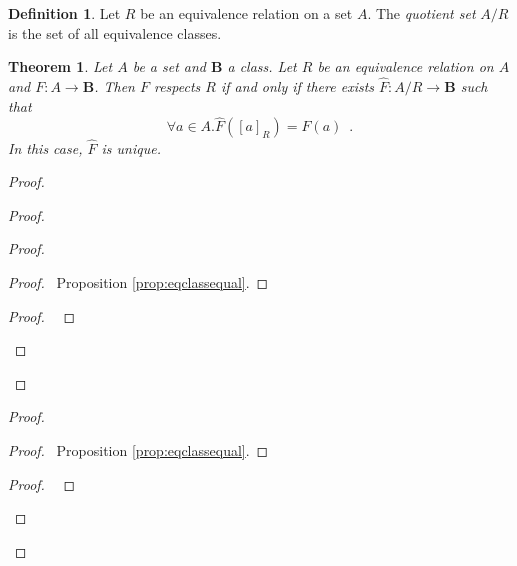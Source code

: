 \documentclass{book}
\let\qed\relax
\newtheorem{thm}[ax]{Theorem}
\theoremstyle{definition}
\newtheorem{df}[ax]{Definition}
\newcommand{\dom}{\ensuremath{\operatorname{dom}}}
\newcommand{\ran}{\ensuremath{\operatorname{ran}}}
\begin{document}
\begin{df}
Let $R$ be an equivalence relation on a set $A$. The \emph{quotient set} $A / R$ is the set of all equivalence classes.
\end{df}

\begin{thm}
Let $A$ be a set and $\mathbf{B}$ a class. Let $R$ be an equivalence relation on $A$ and $F : A \rightarrow \mathbf{B}$. Then $F$ respects $R$ if and only if there exists $\hat{F} : A/R \rightarrow \mathbf{B}$ such that
\[ \forall a \in A. \hat{F}([a]_R) = F(a) \enspace . \]
In this case, $\hat{F}$ is unique.
\end{thm}

\begin{proof}
\pf
{}
\begin{proof}
	\begin{proof}
		\begin{proof}
			\pf\ Proposition \ref{prop:eqclassequal}.
		\end{proof}
		\begin{proof}
			\pf\ 
		\end{proof}
	\end{proof}
	\step{d}{$\dom \hat{F} = A / R$}
	\step{e}{$\ran \hat{F} \subseteq \mathbf{B}$}
\end{proof}
\begin{proof}
		\begin{proof}
			\pf\ Proposition \ref{prop:eqclassequal}.
		\end{proof}
	\begin{proof}
		\pf\ 
	\end{proof}
\end{proof}
\qed
\end{proof}
\end{document}
